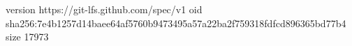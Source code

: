 version https://git-lfs.github.com/spec/v1
oid sha256:7e4b1257d14baee64af5760b9473495a57a22ba2f759318fdfcd896365bd77b4
size 17973
